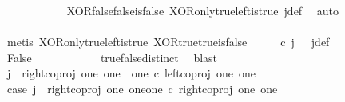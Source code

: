 \begin{isabellebody}
\ \ \ \ \ \ \ \ \ \ \isamarkupfalse%
\ XOR{\isacharunderscore}{\kern0pt}false{\isacharunderscore}{\kern0pt}false{\isacharunderscore}{\kern0pt}is{\isacharunderscore}{\kern0pt}false\ XOR{\isacharunderscore}{\kern0pt}only{\isacharunderscore}{\kern0pt}true{\isacharunderscore}{\kern0pt}left{\isacharunderscore}{\kern0pt}is{\isacharunderscore}{\kern0pt}true\ j{\isacharunderscore}{\kern0pt}def\ \isamarkupfalse%
\ auto\isanewline
\ \ \ \ \ \ \ \ \isamarkupfalse%
\ \isamarkupfalse%
\ {\isachardoublequoteopen}{\isasymt}\ {\isacharequal}{\kern0pt}\ {\isasymf}{\isachardoublequoteclose}\isanewline
\ \ \ \ \ \ \ \ \ \ \isamarkupfalse%
\ {\isacharparenleft}{\kern0pt}metis\ XOR{\isacharunderscore}{\kern0pt}only{\isacharunderscore}{\kern0pt}true{\isacharunderscore}{\kern0pt}left{\isacharunderscore}{\kern0pt}is{\isacharunderscore}{\kern0pt}true\ XOR{\isacharunderscore}{\kern0pt}true{\isacharunderscore}{\kern0pt}true{\isacharunderscore}{\kern0pt}is{\isacharunderscore}{\kern0pt}false\ {\isacartoucheopen}{\isasymlangle}{\isasymt}{\isacharcomma}{\kern0pt}{\isasymt}{\isasymrangle}\ {\isasymamalg}\ {\isasymlangle}{\isasymf}{\isacharcomma}{\kern0pt}{\isasymf}{\isasymrangle}\ {\isasymamalg}\ {\isasymlangle}{\isasymf}{\isacharcomma}{\kern0pt}{\isasymt}{\isasymrangle}\ {\isasymcirc}\isactrlsub c\ j\ {\isacharequal}{\kern0pt}\ {\isasymlangle}{\isasymf}{\isacharcomma}{\kern0pt}{\isasymf}{\isasymrangle}{\isacartoucheclose}\ j{\isacharunderscore}{\kern0pt}def{\isacharparenright}{\kern0pt}\isanewline
\ \ \ \ \ \ \ \ \isamarkupfalse%
\ \isamarkupfalse%
\ False\isanewline
\ \ \ \ \ \ \ \ \ \ \isamarkupfalse%
\ true{\isacharunderscore}{\kern0pt}false{\isacharunderscore}{\kern0pt}distinct\ \isamarkupfalse%
\ blast\isanewline
\ \ \ \ \ \ \isamarkupfalse%
\isanewline
\ \ \ \ \isamarkupfalse%
\isanewline
\ \ \ \ \ \ \isamarkupfalse%
\ {\isachardoublequoteopen}j\ {\isasymnoteq}\ right{\isacharunderscore}{\kern0pt}coproj\ one\ {\isacharparenleft}{\kern0pt}one\ {\isasymCoprod}\ one{\isacharparenright}{\kern0pt}\ {\isasymcirc}\isactrlsub c\ left{\isacharunderscore}{\kern0pt}coproj\ one\ one{\isachardoublequoteclose}\isanewline
\ \ \ \ \ \ \isamarkupfalse%
\ \isamarkupfalse%
\ case{}{\isacharcolon}{\kern0pt}\ {\isachardoublequoteopen}j\ {\isacharequal}{\kern0pt}\ right{\isacharunderscore}{\kern0pt}coproj\ one\ {\isacharparenleft}{\kern0pt}one{\isasymCoprod}one{\isacharparenright}{\kern0pt}\ {\isasymcirc}\isactrlsub c\ right{\isacharunderscore}{\kern0pt}coproj\ one\ one{\isachardoublequoteclose}\isanewline

\end{isabellebody}

